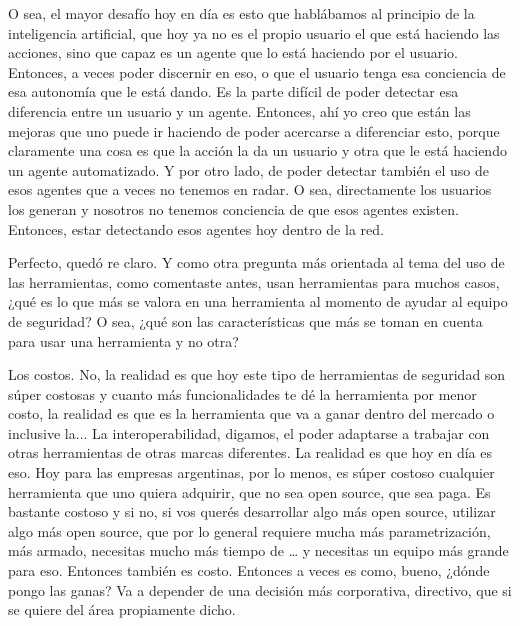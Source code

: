 \begin{description}[leftmargin=0cm, labelsep=0.5cm]
    \item[\textbf{JACUBOVICH LUCIANA:}] O sea, el mayor desafío hoy en día es esto que hablábamos al principio de la inteligencia artificial, que hoy ya no es el propio usuario el que está haciendo las acciones, sino que capaz es un agente que lo está haciendo por el usuario. Entonces, a veces poder discernir en eso, o que el usuario tenga esa conciencia de esa autonomía que le está dando. Es la parte difícil de poder detectar esa diferencia entre un usuario y un agente. Entonces, ahí yo creo que están las mejoras que uno puede ir haciendo de poder acercarse a diferenciar esto, porque claramente una cosa es que la acción la da un usuario y otra que le está haciendo un agente automatizado. Y por otro lado, de poder detectar también el uso de esos agentes que a veces no tenemos en radar. O sea, directamente los usuarios los generan y nosotros no tenemos conciencia de que esos agentes existen. Entonces, estar detectando esos agentes hoy dentro de la red.

    \item[\textbf{MOCIULSKY SANTIAGO:}] Perfecto, quedó re claro. Y como otra pregunta más orientada al tema del uso de las herramientas, como comentaste antes, usan herramientas para muchos casos, ¿qué es lo que más se valora en una herramienta al momento de ayudar al equipo de seguridad? O sea, ¿qué son las características que más se toman en cuenta para usar una herramienta y no otra?

    \item[\textbf{JACUBOVICH LUCIANA:}] Los costos. No, la realidad es que hoy este tipo de herramientas de seguridad son súper costosas y cuanto más funcionalidades te dé la herramienta por menor costo, la realidad es que es la herramienta que va a ganar dentro del mercado o inclusive la... La interoperabilidad, digamos, el poder adaptarse a trabajar con otras herramientas de otras marcas diferentes. La realidad es que hoy en día es eso. Hoy para las empresas argentinas, por lo menos, es súper costoso cualquier herramienta que uno quiera adquirir, que no sea open source, que sea paga. Es bastante costoso y si no, si vos querés desarrollar algo más open source, utilizar algo más open source, que por lo general requiere mucha más parametrización, más armado, necesitas mucho más tiempo de … y necesitas un equipo más grande para eso. Entonces también es costo. Entonces a veces es como, bueno, ¿dónde pongo las ganas? Va a depender de una decisión más corporativa, directivo, que si se quiere del área propiamente dicho.


\end{description}
